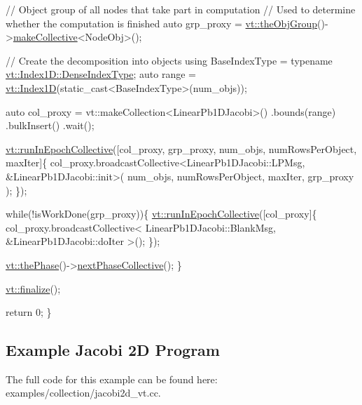 \begin{DoxyCodeInclude}
  \textcolor{comment}{// Object group of all nodes that take part in computation}
  \textcolor{comment}{// Used to determine whether the computation is finished}
  \textcolor{keyword}{auto} grp\_proxy = \hyperlink{namespacevt_a833f0115b692f578167cbd88e30d39c5}{vt::theObjGroup}()->\hyperlink{structvt_1_1objgroup_1_1_obj_group_manager_a651c44a47c6bcdc9f1b6c9e857fa03f2}{makeCollective}<NodeObj>();

  \textcolor{comment}{// Create the decomposition into objects}
  \textcolor{keyword}{using} BaseIndexType = \textcolor{keyword}{typename} \hyperlink{structvt_1_1index_1_1_dense_index_array_a36698427e28045290d1fb072573275ec}{vt::Index1D::DenseIndexType};
  \textcolor{keyword}{auto} range = \hyperlink{namespacevt_a5540efc78234273e1796fb003fe4d234}{vt::Index1D}(static\_cast<BaseIndexType>(num\_objs));

  \textcolor{keyword}{auto} col\_proxy = vt::makeCollection<LinearPb1DJacobi>()
    .bounds(range)
    .bulkInsert()
    .wait();

  \hyperlink{namespacevt_a2fc4ef34f30b49a1781d765804bfadbb}{vt::runInEpochCollective}([col\_proxy, grp\_proxy, num\_objs, numRowsPerObject, 
      maxIter]\{
    col\_proxy.broadcastCollective<LinearPb1DJacobi::LPMsg, &LinearPb1DJacobi::init>(
      num\_objs, numRowsPerObject, maxIter, grp\_proxy
    );
  \});

  \textcolor{keywordflow}{while}(!isWorkDone(grp\_proxy))\{
    \hyperlink{namespacevt_a2fc4ef34f30b49a1781d765804bfadbb}{vt::runInEpochCollective}([col\_proxy]\{
      col\_proxy.broadcastCollective<
        LinearPb1DJacobi::BlankMsg, &LinearPb1DJacobi::doIter
      >();
    \});

    \hyperlink{namespacevt_a3799d6b51fb71d7b6505760aad457e61}{vt::thePhase}()->\hyperlink{structvt_1_1phase_1_1_phase_manager_ac94bfde4a103cbdec426542191c41092}{nextPhaseCollective}();
  \}

  \hyperlink{namespacevt_a540d90dbd6e97b69f1dcbc9ee9314cff}{vt::finalize}();

  \textcolor{keywordflow}{return} 0;
\}

\end{DoxyCodeInclude}
\hypertarget{jacobi2d-example}{}\subsection{Example Jacobi 2D Program}\label{jacobi2d-example}
The full code for this example can be found here\+: {\ttfamily examples/collection/jacobi2d\+\_\+vt.\+cc}.


